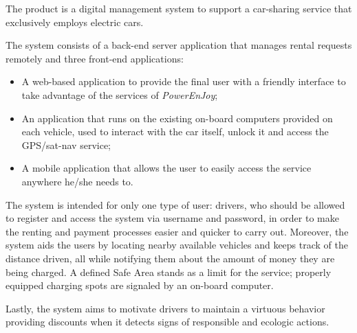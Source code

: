 The product is a digital management system to support a car-sharing service that exclusively employs electric cars.

The system consists of a back-end server application that manages rental requests remotely and three front-end applications:

\begin{itemize}
\item A web-based application to provide the final user with a friendly interface to take advantage of the services of \hbox{\emph{PowerEnJoy}};
\item An application that runs on the existing on-board computers provided on each vehicle, used to interact with the car itself, unlock it and access the GPS/sat-nav service;
\item A mobile application that allows the user to easily access the service anywhere he/she needs to.
\end{itemize}
The system is intended for only one type of user: drivers, who should be allowed to register and access the system via username and password, in order to make the renting and payment processes easier and quicker to carry out. Moreover, the system aids the users by locating nearby available vehicles and keeps track of the distance driven, all while notifying them about the amount of money they are being charged. A defined Safe Area stands as a limit for the service; properly equipped charging spots are signaled by an on-board computer.

Lastly, the system aims to motivate drivers to maintain a virtuous behavior providing discounts when it detects signs of responsible and ecologic actions.
